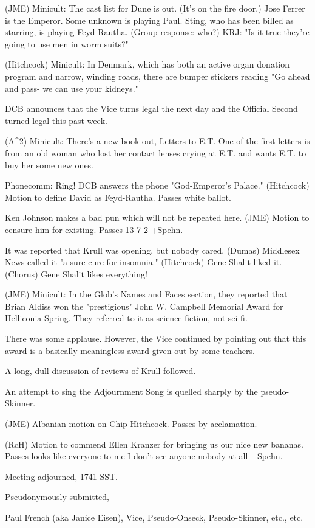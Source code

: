 \documentclass[12pt]{article}
\begin{document}
(JME) Minicult: The cast list for Dune is out. (It's on the fire door.) Jose Ferrer is the Emperor. Some unknown is playing Paul. Sting, who has been billed as starring, is playing Feyd-Rautha. (Group response: who?) KRJ: "Is it true they're going to use men in worm suits?"

(Hitchcock) Minicult: In Denmark, which has both an active organ donation program and narrow, winding roads, there are bumper stickers reading "Go ahead and pass- we can use your kidneys."

DCB announces that the Vice turns legal the next day and the Official Second turned legal this past week.

(A^2) Minicult: There's a new book out, Letters to E.T. One of the first letters is from an old woman who lost her contact lenses crying at E.T. and wants E.T. to buy her some new ones.

Phonecomm: Ring! DCB answers the phone "God-Emperor's Palace." (Hitchcock) Motion to define David as Feyd-Rautha. Passes white ballot.

Ken Johnson makes a bad pun which will not be repeated here. (JME) Motion to censure him for existing. Passes 13-7-2 +Spehn.

It was reported that Krull was opening, but nobody cared. (Dumas) Middlesex News called it "a sure cure for insomnia." (Hitchcock) Gene Shalit liked it. (Chorus) Gene Shalit likes everything!

(JME) Minicult: In the Glob's Names and Faces section, they reported that Brian Aldiss won the "prestigious" John W. Campbell Memorial Award for Helliconia Spring. They referred to it as science fiction, not sci-fi.

There was some applause. However, the Vice continued by pointing out that this award is a basically meaningless award given out by some teachers.

A long, dull discussion of reviews of Krull followed.

An attempt to sing the Adjournment Song is quelled sharply by the pseudo-Skinner.

(JME) Albanian motion on Chip Hitchcock. Passes by acclamation.

(RcH) Motion to commend Ellen Kranzer for bringing us our nice new bananas. Passes looks like everyone to me-I don't see anyone-nobody at all +Spehn.

\vspace{12pt}

\noindent
Meeting adjourned, 1741 SST.

\vspace{18pt}

\centerline{Pseudonymously submitted,}
\centerline{Paul French (aka Janice Eisen), Vice, Pseudo-Onseck, Pseudo-Skinner, etc., etc.}
\end{document}
